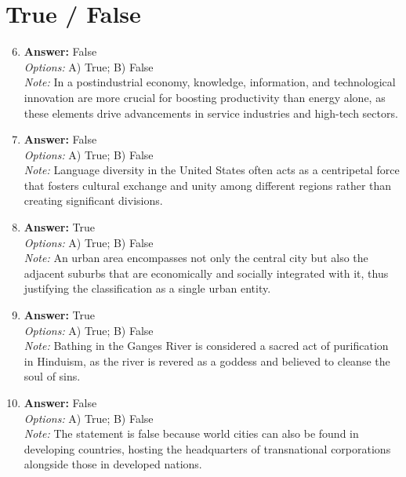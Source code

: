 \documentclass[12pt]{article}
\begin{document}
\section*{True / False}
\begin{enumerate}[label=\arabic*.]
\setcounter{enumi}{5}
\item \textbf{Answer:} False
\\ \textit{Options:} A) True; B) False
\\ \textit{Note:} In a postindustrial economy, knowledge, information, and technological innovation are more crucial for boosting productivity than energy alone, as these elements drive advancements in service industries and high-tech sectors.
\item \textbf{Answer:} False
\\ \textit{Options:} A) True; B) False
\\ \textit{Note:} Language diversity in the United States often acts as a centripetal force that fosters cultural exchange and unity among different regions rather than creating significant divisions.
\item \textbf{Answer:} True
\\ \textit{Options:} A) True; B) False
\\ \textit{Note:} An urban area encompasses not only the central city but also the adjacent suburbs that are economically and socially integrated with it, thus justifying the classification as a single urban entity.
\item \textbf{Answer:} True
\\ \textit{Options:} A) True; B) False
\\ \textit{Note:} Bathing in the Ganges River is considered a sacred act of purification in Hinduism, as the river is revered as a goddess and believed to cleanse the soul of sins.
\item \textbf{Answer:} False
\\ \textit{Options:} A) True; B) False
\\ \textit{Note:} The statement is false because world cities can also be found in developing countries, hosting the headquarters of transnational corporations alongside those in developed nations.
\end{enumerate}
\end{document}
